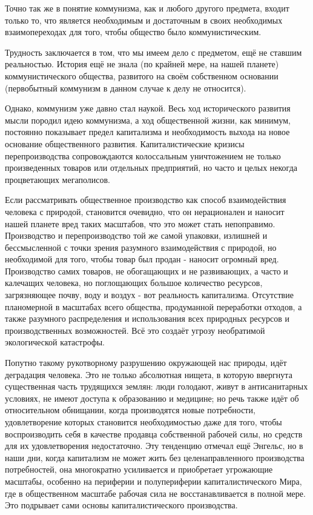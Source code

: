 \documentclass[12pt,a4paper,openany]{book}
\begin{document}
Точно так же в понятие коммунизма, как и любого другого предмета, входит только то, что является необходимым и достаточным в своих необходимых взаимопереходах для того, чтобы общество было коммунистическим.

Трудность заключается в том, что мы имеем дело с предметом, ещё не ставшим реальностью. История ещё не знала (по крайней мере, на нашей планете) коммунистического общества, развитого на своём собственном основании (первобытный коммунизм в данном случае к делу не относится).

Однако, коммунизм уже давно стал наукой. Весь ход исторического развития мысли породил идею коммунизма, а ход общественной жизни, как минимум, постоянно показывает предел капитализма и необходимость выхода на новое основание общественного развития. Капиталистические кризисы перепроизводства сопровождаются колоссальным уничтожением не только произведенных товаров или отдельных предприятий, но часто и целых некогда процветающих мегаполисов.

Если рассматривать общественное производство как способ взаимодействия человека с природой, становится очевидно, что он нерационален и наносит нашей планете вред таких масштабов, что это может стать непоправимо. Производство и перепроизводство той же самой упаковки, излишней и бессмысленной с точки зрения разумного взаимодействия с природой, но необходимой для того, чтобы товар был продан - наносит огромный вред. Производство самих товаров, не обогащающих и не развивающих, а часто и калечащих человека, но поглощающих большое количество ресурсов, загрязняющее почву, воду и воздух - вот реальность капитализма. Отсутствие планомерной в масштабах всего общества, продуманной переработки отходов, а также разумного распределения и использования всех природных ресурсов и производственных возможностей. Всё это создаёт угрозу необратимой экологической катастрофы.

Попутно такому рукотворному разрушению окружающей нас природы, идёт деградация человека. Это не только абсолютная нищета, в которую ввергнута существенная часть трудящихся землян: люди голодают, живут в антисанитарных условиях, не имеют доступа к образованию и медицине; но речь также идёт об относительном обнищании, когда производятся новые потребности, удовлетворение которых становится необходимостью даже для того, чтобы воспроизводить себя в качестве продавца собственной рабочей силы, но средств для их удовлетворения недостаточно. Эту тенденцию отмечал ещё Энгельс, но в наши дни, когда капитализм не может жить без целенаправленного производства потребностей, она многократно усиливается и приобретает угрожающие масштабы, особенно на периферии и полупериферии капиталистического Мира, где в общественном масштабе рабочая сила не восстанавливается в полной мере. Это подрывает сами основы капиталистического производства.
\end{document}
